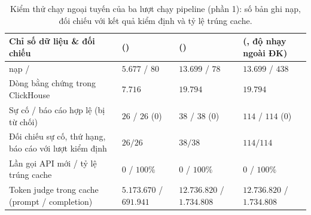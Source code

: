 \begin{table}[H]
  \centering
  \caption[Kiểm thử chạy ngoại tuyến: quy mô bản ghi, đối chiếu và cache]{Kiểm thử chạy ngoại tuyến của ba lượt chạy pipeline (phần 1): số bản ghi nạp, đối chiếu với kết quả kiểm định và tỷ lệ trúng cache.}
  \label{tab:ch6-kiem-thu-dulieu}
  \tblfont
  \tblsetup
  \setlength{\tabcolsep}{3.5pt}
  \begin{tabularx}{\linewidth}{|Y|>{\raggedright\arraybackslash}p{3.0cm}|>{\raggedright\arraybackslash}p{3.1cm}|>{\raggedright\arraybackslash}p{3.4cm}|}
    \hline
    \textbf{Chỉ số dữ liệu \& đối chiếu} & \textbf{ ()} & \textbf{ ()} & \textbf{ (, độ nhạy ngoài ĐK)} \\
    \hline
     nạp /  & $5.677$ / $80$ & $13.699$ / $78$ & $13.699$ / $438$ \\
    \hline
    Dòng bằng chứng trong ClickHouse & $7.716$ & $19.794$ & $19.794$ \\
    \hline
    Sự cố / báo cáo hợp lệ (bị từ chối) & $26$ / $26$ ($0$) & $38$ / $38$ ($0$) & $114$ / $114$ ($0$) \\
    \hline
    Đối chiếu sự cố, thứ hạng, báo cáo với lượt kiểm định & $26/26$ & $38/38$ & $114/114$ \\
    \hline
    Lần gọi API mới / tỷ lệ trúng cache & $0$ / $100\%$ & $0$ / $100\%$ & $0$ / $100\%$ \\
    \hline
    Token judge trong cache (prompt / completion) & $5.173.670$ / $691.941$ & $12.736.820$ / $1.734.808$ & $12.736.820$ / $1.734.808$ \\
    \hline
  \end{tabularx}
\end{table}

